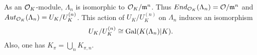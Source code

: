 \begin{theorem}
  As an $\mathcal{O}_{K}$-module, $\Lambda_{n}$ is isomorphic to $\mathcal{O}_{K}/\mathfrak{m}^{n}$.
  Thus $End_{\mathcal{O}_{K}}(\Lambda_{n}) = \mathcal{O}/\mathfrak{m}^{n}$ and $Aut_{\mathcal{O}_{K}}(\Lambda_{n}) = U_{K}/U_{K}^{(n)}$.
  This action of $U_{K}/U_{K}^{(n)}$ on $\Lambda_{n}$ induces an isomorphism
  \[ U_{K}/U_{K}^{(n)} \cong \operatorname{Gal}(K(\Lambda_{n})|K). \]
  Also, one has $K_{\pi} = \bigcup_{n} K_{\pi,n}$.
\end{theorem}

